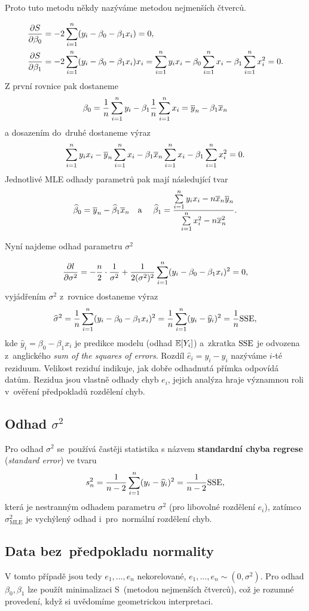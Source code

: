Proto tuto metodu někdy nazýváme metodou nejmenších čtverců.

 $$
\begin{aligned}
&\frac{\partial S}{\partial \beta_0} = - 2 \sum\limits_{i=1}^{n}(y_i -  \beta_0  - \beta_1 x_i) = 0, \\
&\frac{\partial S}{\partial \beta_1} = - 2 \sum\limits_{i=1}^{n}(y_i -  \beta_0  - \beta_1 x_i) x_i = \sum\limits_{i=1}^{n} y_i x_i - \beta_0 \sum\limits_{i=1}^{n} x_i - \beta_1 \sum\limits_{i=1}^{n} x_i^2 = 0.
\end{aligned}
 $$
Z první rovnice pak dostaneme
 $$
 \beta_0 = \frac{1}{n} \sum\limits_{i=1}^{n} y_i -  \beta_1 \frac{1}{n} \sum\limits_{i=1}^{n} x_i = \overline{y}_n - \beta_1 \overline{x}_n
 $$
a dosazením do~druhé dostaneme výraz
 $$
\sum\limits_{i=1}^{n} y_i x_i - \overline{y}_n \sum\limits_{i=1}^{n} x_i - \beta_1 \overline{x}_n \sum\limits_{i=1}^{n} x_i - \beta_1 \sum\limits_{i=1}^{n} x_i^2 = 0.
 $$
Jednotlivé MLE odhady parametrů pak mají následující tvar
 $$
\widehat{\beta}_0 = \overline{y}_n - \widehat{\beta}_1 \overline{x}_n \quad \text{a}~\quad
\widehat{\beta}_1 = \frac{\sum\limits_{i=1}^{n} y_i x_i - n \overline{x}_n \overline{y}_n}{\sum\limits_{i=1}^{n} x_i^2 - n \overline{x}_n^2}.
 $$

Nyní najdeme odhad parametru $\sigma^2$

 $$
\frac{ \partial l}{ \partial \sigma^2} = -\frac{n}{2} \cdot \frac{1}{\sigma^2} + \frac{1}{2 (\sigma^2)^2} \sum\limits_{i=1}^{n} (y_i -  \beta_0  - \beta_1 x_i)^2 = 0,
 $$
vyjádřením $\sigma^2$ z~rovnice dostaneme výraz
 $$
\widehat{\sigma}^2 = \frac{1}{n} \sum\limits_{i=1}^{n} (y_i -  \beta_0  - \beta_1 x_i)^2 = \frac{1}{n} \sum\limits_{i=1}^{n} (y_i -  \widehat{y}_i)^2 = \frac{1}{n} \mathrm{SSE},
 $$
kde $\widehat{y}_i = \beta_0  - \beta_1 x_i$ je predikce modelu (odhad $\mathbb{E} [Y_i]$) a~zkratka $\mathrm{SSE}$ je odvozena z~anglického \textit{sum of the squares of errors}. Rozdíl $\widehat{e}_i = y_i -  \widehat{y}_i$ nazýváme $i$-té reziduum. Velikost reziduí indikuje, jak dobře odhadnutá přímka odpovídá datům. Rezidua jsou vlastně odhady chyb $e_i$,  jejich analýza hraje významnou roli v~ověření předpokladů rozdělení chyb.

\subsection*{Odhad $\sigma^2$}
Pro odhad $\sigma^2$ se~používá častěji statistika s názvem \textbf{standardní chyba regrese} (\textit{standard error}) ve tvaru $$s^2_n = \frac{1}{n - 2} \sum\limits_{i=1}^{n} (y_i -  \widehat{y}_i)^2 = \frac{1}{n-2} \mathrm{SSE},$$ která je nestranným odhadem parametru $\sigma^2$ (pro libovolné rozdělení $e_i$), zatímco $\sigma^2_{\text{MLE}}$ je vychýlený odhad i~pro~normální rozdělení chyb.

\subsection{Data bez~předpokladu normality}
V tomto případě jsou tedy $e_1,..., e_n$ nekorelované, $e_1,..., e_n \sim (0,\sigma^2)$.
Pro odhad $\beta_0, \beta_1$ lze použít minimalizaci S~(metodou nejmenších čtverců), což je rozumné provedení, když si uvědomíme geometrickou interpretaci.


